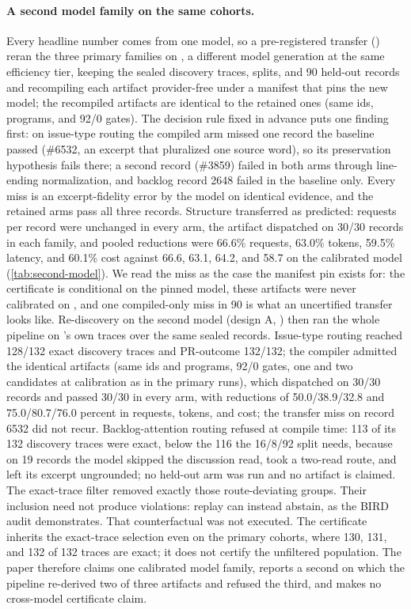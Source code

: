 \paragraph{A second model family on the same cohorts.}
Every headline number comes from one model, so a pre-registered transfer
() reran the
three primary families on , a different model generation at
the same efficiency tier, keeping the sealed discovery traces, splits, and 90
held-out records and recompiling each artifact provider-free under a manifest
that pins the new model; the recompiled artifacts are identical to the retained
ones (same ids, programs, and 92/0 gates). The decision rule fixed in advance
puts one finding first: on issue-type routing the compiled arm missed one
record the baseline passed (\#6532, an excerpt that pluralized one source
word), so its preservation hypothesis fails there; a second record (\#3859)
failed in both arms through line-ending normalization, and backlog record 2648
failed in the baseline only. Every miss is an excerpt-fidelity error by the
model on identical evidence, and the retained  arms pass all
three records. Structure transferred as predicted: requests per record were
unchanged in every arm, the artifact dispatched on 30/30 records in each
family, and pooled reductions were 66.6\% requests, 63.0\% tokens, 59.5\%
latency, and 60.1\% cost against 66.6, 63.1, 64.2, and 58.7 on the calibrated
model (\cref{tab:second-model}). We read the miss as the case the manifest pin
exists for: the certificate is conditional on the pinned model, these artifacts
were never calibrated on , and one compiled-only miss in 90 is
what an uncertified transfer looks like. Re-discovery on the second model
(design A, )
then ran the whole pipeline on 's own traces over the same
sealed records. Issue-type routing reached 128/132 exact discovery traces and
PR-outcome 132/132; the compiler admitted the identical artifacts (same ids and
programs, 92/0 gates, one and two candidates at calibration as in the primary
runs), which dispatched on 30/30 records and passed 30/30 in every arm, with
reductions of 50.0/38.9/32.8 and 75.0/80.7/76.0 percent in requests, tokens,
and cost; the transfer miss on record 6532 did not recur. Backlog-attention
routing refused at compile time: 113 of its 132 discovery traces were exact,
below the 116 the 16/8/92 split needs, because on 19 records the model skipped
the discussion read, took a two-read route, and left its excerpt ungrounded; no
held-out arm was run and no artifact is claimed. The exact-trace filter removed
exactly those route-deviating groups. Their inclusion need not produce
violations: replay can instead abstain, as the BIRD audit demonstrates. That
counterfactual was not executed. The certificate inherits the exact-trace
selection even on the primary cohorts, where 130, 131, and 132 of 132 traces
are exact; it does not certify the unfiltered population.
The paper therefore claims one calibrated model family, reports a second on
which the pipeline re-derived two of three artifacts and refused the third,
and makes no cross-model certificate claim.

